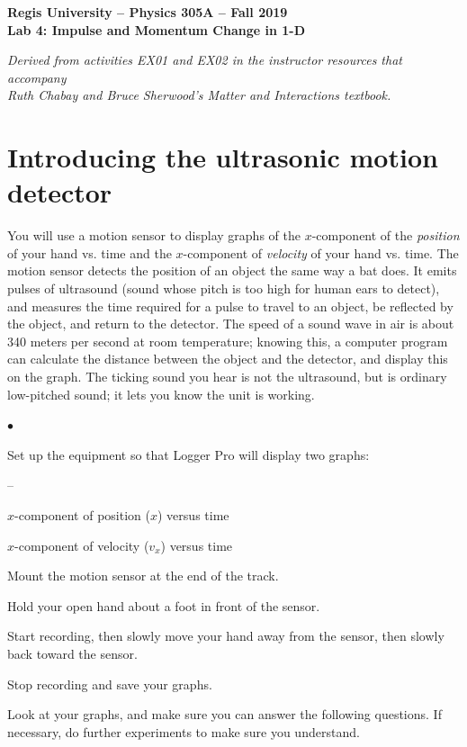 \documentclass[11pt]{article}
\newcommand{\squishlist}{
   \begin{list}{$\bullet$}
    { \setlength{\itemsep}{0pt}      \setlength{\parsep}{3pt}
      \setlength{\topsep}{3pt}       \setlength{\partopsep}{0pt}
      \setlength{\leftmargin}{1.5em} \setlength{\labelwidth}{1em}
      \setlength{\labelsep}{0.5em} } }
\newcommand{\squishlistB}{
   \begin{list}{--}
    { \setlength{\itemsep}{0pt}      \setlength{\parsep}{3pt}
      \setlength{\topsep}{3pt}       \setlength{\partopsep}{0pt}
      \setlength{\leftmargin}{1.5em} \setlength{\labelwidth}{1em}
      \setlength{\labelsep}{0.5em} } }
\newcommand{\squishend}{
    \end{list}  }
\begin{document}
\begin{center}
\medskip
{\bf{Regis University -- Physics 305A -- Fall 2019}} \\
{\bf{Lab 4: Impulse and Momentum Change in 1-D}} \\
\medskip

{\em{Derived from activities EX01 and EX02 in the instructor resources that
 accompany \\ Ruth Chabay and Bruce Sherwood's {\em Matter and Interactions} 
 textbook.}}
\medskip
\end{center}

\section{Introducing the ultrasonic motion detector}

You will use a motion sensor to display graphs of the $x$-component of the {\em position} of your hand vs. time and the $x$-component of {\em velocity} of your hand vs. time.  The motion sensor detects the position of an object the same way a bat does.
It emits pulses of ultrasound (sound whose pitch is too high for human
ears to detect), and measures the time required for a pulse to travel to an
object, be reflected by the object, and return to the detector. The speed of
a sound wave in air is about 340 meters per second at room temperature; knowing this, a
computer program can calculate the distance between the object and the
detector, and display this on the graph.  The ticking sound you hear is not
the ultrasound, but is ordinary low-pitched sound; it lets you know the unit
is working.

\squishlist
\item Set up the equipment so that Logger Pro will display two graphs:
\squishlistB
\item $x$-component of position ($x$) versus time
\item $x$-component of velocity ($v_x$) versus time
\squishend
\item Mount the motion sensor at the end of the track.
\item Hold your open hand about a foot in front of the sensor.
\item Start recording, then slowly move your hand away from the sensor, then slowly back toward the sensor.
\item Stop recording and save your graphs.\\
\squishend

Look at your graphs, and make sure you can answer the following questions. If necessary, do further experiments to make sure you understand.\\
\end{document}
